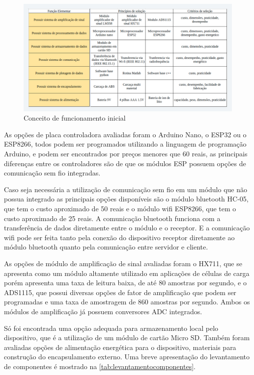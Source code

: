 \begin{figure}[htb]
	\caption{\label{fig:2036} Conceito de funcionamento inicial}
	\begin{center}
		\includegraphics[width=\textwidth]{pictures/2036.png}
	\end{center}
\end{figure}

As opções de placa controladora avaliadas foram o Arduino Nano, o ESP32 ou o ESP8266, todos podem ser programados utilizando a linguagem de programação Arduino, e podem ser encontrados por preços menores que 60 reais, as principais diferenças entre os controladores são de que os módulos ESP possuem opções de comunicação sem fio integradas.

Caso seja necessária a utilização de comunicação sem fio em um módulo que não possua integrado as principais opções disponíveis são o módulo bluetooth HC-05, que tem o custo aproximado de 50 reais e o módulo wifi ESP8266, que tem o custo aproximado de 25 reais. A comunicação bluetooth funciona com a transferência de dados diretamente entre o módulo e o receptor. E a comunicação wifi pode ser feita tanto pela conexão do dispositivo receptor diretamente ao módulo bluetooth quanto pela comunicação entre servidor e cliente.

As opções de módulo de amplificação de sinal avaliadas foram o HX711, que se apresenta como um módulo altamente utilizado em aplicações de células de carga porém apresenta uma taxa de leitura baixa, de até 80 amostras por segundo, e o ADS1115, que possui diversas opções de fator de amplificação que podem ser programadas e uma taxa de amostragem de 860 amostras por segundo. Ambos os módulos de amplificação já possuem conversores ADC integrados.

Só foi encontrada uma opção adequada para armazenamento local pelo dispositivo, que é a utilização de um módulo de cartão Micro SD. Também foram avaliadas opções de alimentação energética para o dispositivo, materiais para construção do encapsulamento externo. Uma breve apresentação do levantamento de componentes é mostrado na \autoref{tab:levantamentocomponentes}.


